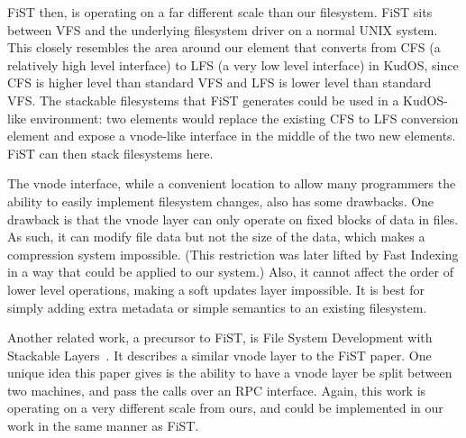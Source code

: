 FiST then, is operating on a far different scale than our filesystem.
FiST sits between VFS and the underlying filesystem driver on a normal
UNIX system. This closely resembles the area around our element that
converts from CFS (a relatively high level interface) to LFS (a very
low level interface) in KudOS, since CFS is higher level than standard
VFS and LFS is lower level than standard VFS. The stackable
filesystems that FiST generates could be used in a KudOS-like
environment: two elements would replace the existing CFS to LFS
conversion element and expose a vnode-like interface in the middle of
the two new elements. FiST can then stack filesystems here.

The vnode interface, while a convenient location to allow many
programmers the ability to easily implement filesystem changes, also
has some drawbacks. One drawback is that the vnode layer can only
operate on fixed blocks of data in files. As such, it can modify file
data but not the size of the data, which makes a compression system
impossible. (This restriction was later lifted by Fast
Indexing\cite{zadokfast} in a way that could be applied to our
system.)  Also, it cannot affect the order of lower level operations,
making a soft updates layer impossible. It is best for simply adding
extra metadata or simple semantics to an existing filesystem.

Another related work, a precursor to FiST, is File System Development
with Stackable Layers~\cite{heidemann93stack}. It describes a similar
vnode layer to the FiST paper. One unique idea this paper gives is the
ability to have a vnode layer be split between two machines, and pass
the calls over an RPC interface. Again, this work is operating on a
very different scale from ours, and could be implemented in our work
in the same manner as FiST.
